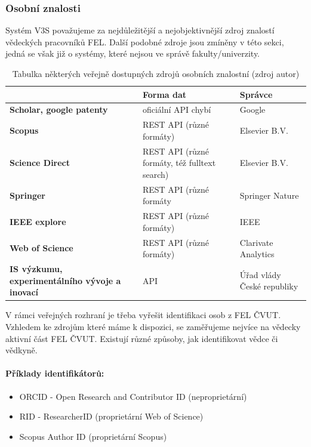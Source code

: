 \subsubsection{Osobní znalosti}
Systém V3S považujeme za nejdůležitější a nejobjektivnější zdroj znalostí vědeckých pracovníků FEL. Další podobné zdroje jsou zmíněny v této sekci, jedná se však již o systémy, které nejsou ve správě fakulty/univerzity.
\begin{table}[h!]
\begin{ctucolortab}
\begin{tabularx}{0.95\linewidth}{X|p{5cm}|X}
\bfseries  & \bfseries Forma dat &  \bfseries Správce\\\hline 
    \textbf{Scholar, google patenty} & oficiální API chybí & Google\\ \hline
    \textbf{Scopus} & REST API (různé formáty) & Elsevier B.V. \\ \hline
    \textbf{Science Direct} & REST API (různé formáty, též fulltext search) & Elsevier B.V.\\ \hline
    \textbf{Springer} & REST API (různé formáty & Springer Nature \\ \hline
    \textbf{IEEE explore} & REST API (různé formáty) & IEEE \\ \hline
    \textbf{Web of Science} & REST API (různé formáty) & Clarivate Analytics \\ \hline
    \textbf{IS výzkumu, experimentálního vývoje a inovací} & API \cite{rvvi} & Úřad vlády České republiky \\ \hline
\end{tabularx}
\end{ctucolortab}
	\caption{Tabulka některých veřejně dostupných zdrojů osobních znalostní (zdroj autor)}
	\label{tab:data-sources-public}
\end{table}

 V rámci veřejných rozhraní je třeba vyřešit identifikaci osob z FEL ČVUT. Vzhledem ke zdrojům které máme k dispozici, se zaměřujeme nejvíce na vědecky aktivní část FEL ČVUT. Existují různé způsoby, jak identifikovat vědce či vědkyně.\par
 \paragraph{Příklady identifikátorů:}
 \begin{itemize}
     \item ORCID - Open Research and Contributor ID (neproprietární)
     \item RID - ResearcherID (proprietární Web of Science)
     \item Scopus Author ID (proprietární Scopus)
 \end{itemize}

